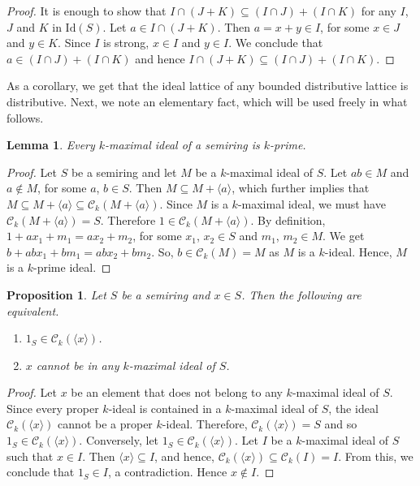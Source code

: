 \documentclass[11pt,english]{amsart}
\newtheorem{proposition}[theorem]{Proposition}
\newtheorem{lemma}[theorem]{Lemma}
\theoremstyle{definition}
\numberwithin{equation}{section}
\begin{document}
\begin{proof}
    It is enough to show that $I\cap (J+K)\subseteq (I\cap J)+(I\cap K)$ for any $I$, $J$ and $K$ in $\mathrm{Id}(S)$. Let $a\in I\cap (J+K)$. Then $a=x+y\in I$, for some $x\in J$ and $y\in K$. Since $I$ is strong, $x\in I$ and $y\in I$. We conclude that $a\in (I\cap J)+(I\cap K)$ and hence $I\cap (J+K)\subseteq (I\cap J)+(I\cap K)$.
\end{proof}

As a corollary, we get that the ideal lattice of any bounded distributive lattice is distributive. 
Next, we note an elementary fact, which will be used freely in what follows.
\begin{lemma}\label{loc16}
    Every $k$-maximal ideal of a semiring is $k$-prime.
\end{lemma}
    
\begin{proof}
    Let $S$ be a semiring and let $M$ be a $k$-maximal ideal of $S$. Let $ab \in M$ and $a \notin M$, for some $a$, $b \in S$. Then $M \subseteq M+\langle a\rangle$, which further implies that $M \subseteq M+\langle a\rangle  \subseteq \mathcal{C}_k(M+\langle a\rangle)$. Since $M$ is a $k$-maximal ideal, we must have $\mathcal{C}_k(M+\langle a\rangle)= S$. Therefore $1 \in \mathcal{C}_k(M+\langle a\rangle)$. By definition, $1+ ax_1+m_1 = ax_2+m_2$, for some $x_1$, $x_2 \in S$ and $m_1$, $m_2 \in M$. We get $b+abx_1+bm_1 = abx_2+bm_2$. So, $b \in \mathcal{C}_k(M)=M$ as $M$ is a $k$-ideal. Hence, $M$ is a  $k$-prime ideal. 
\end{proof}

\begin{proposition}
    Let $S$ be a semiring and $x\in S$. Then the following are equivalent.
    \begin{enumerate}
        \item $1_{S}\in \mathcal{C}_k(\langle x \rangle)$.
        \item $x$ cannot be in any $k$-maximal ideal of $S$.
    \end{enumerate}
\end{proposition}

\begin{proof}
    Let $x$ be an element that does not belong to any $k$-maximal ideal of $S$. Since every proper $k$-ideal is contained in a $k$-maximal ideal of $S$, the ideal $\mathcal{C}_k(\langle x \rangle)$ cannot be a proper $k$-ideal. Therefore, $\mathcal{C}_k(\langle x \rangle)=S$ and so $1_{S}\in \mathcal{C}_k(\langle x \rangle)$. Conversely, let $1_{S} \in \mathcal{C}_k(\langle x \rangle)$. Let $I$ be a $k$-maximal ideal of $S$ such that $x\in I$. Then $\langle x \rangle\subseteq I$, and hence, $\mathcal{C}_k(\langle x \rangle) \subseteq \mathcal{C}_k(I)=I$. From this, we conclude that $1_{S} \in I$, a contradiction. Hence $x\notin I$.
\end{proof}
\end{document}
